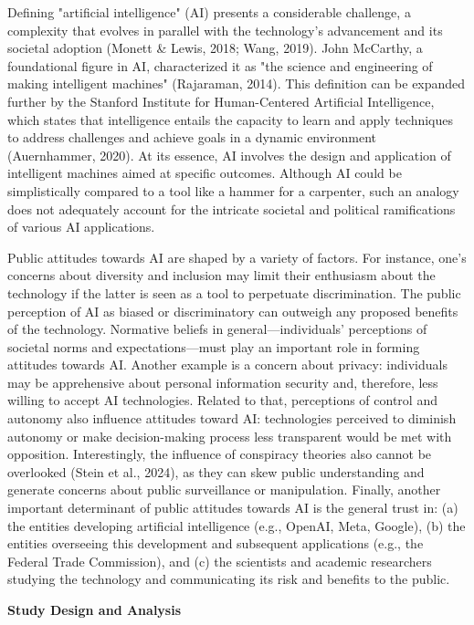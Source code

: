 Defining "artificial intelligence" (AI) presents a considerable challenge, a complexity that evolves in parallel with the technology's advancement and its societal adoption (Monett \& Lewis, 2018; Wang, 2019). John McCarthy, a foundational figure in AI, characterized it as "the science and engineering of making intelligent machines" (Rajaraman, 2014). This definition can be expanded further by the Stanford Institute for Human-Centered Artificial Intelligence, which states that intelligence entails the capacity to learn and apply techniques to address challenges and achieve goals in a dynamic environment (Auernhammer, 2020). At its essence, AI involves the design and application of intelligent machines aimed at specific outcomes. Although AI could be simplistically compared to a tool like a hammer for a carpenter, such an analogy does not adequately account for the intricate societal and political ramifications of various AI applications.

Public attitudes towards AI are shaped by a variety of factors. For instance, one’s concerns about diversity and inclusion may limit their enthusiasm about the technology if the latter is seen as a tool to perpetuate discrimination. The public perception of AI as biased or discriminatory can outweigh any proposed benefits of the technology. Normative beliefs in general—individuals' perceptions of societal norms and expectations—must play an important role in forming attitudes towards AI. Another example is a concern about privacy: individuals may be apprehensive about personal information security and, therefore, less willing to accept AI technologies. Related to that, perceptions of control and autonomy also influence attitudes toward AI: technologies perceived to diminish autonomy or make decision-making process less transparent would be met with opposition. Interestingly, the influence of conspiracy theories also cannot be overlooked (Stein et al., 2024), as they can skew public understanding and generate concerns about public surveillance or manipulation. Finally, another important determinant of public attitudes towards AI is the general trust in: (a) the entities developing artificial intelligence (e.g., OpenAI, Meta, Google), (b) the entities overseeing this development and subsequent applications (e.g., the Federal Trade Commission), and (c) the scientists and academic researchers studying the technology and communicating its risk and benefits to the public.

\textbf{Study Design and Analysis}

